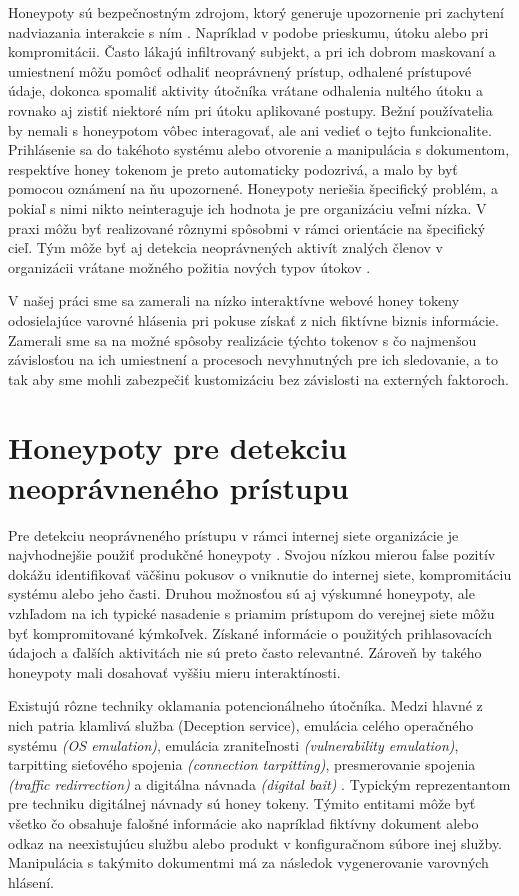 \documentclass[conference, 11pt,slovak,a4paper,twoside]{IEEEtran}
\begin{document}
Honeypoty sú bezpečnostným zdrojom, ktorý generuje upozornenie pri zachytení nadviazania interakcie s ním \cite{sanders_intrusion_2020}. Napríklad v podobe prieskumu, útoku alebo pri kompromitácii. Často lákajú infiltrovaný subjekt, a pri ich dobrom maskovaní a umiestnení môžu pomôcť odhaliť neoprávnený prístup, odhalené prístupové údaje, dokonca spomaliť aktivity útočníka vrátane odhalenia nultého útoku a rovnako aj zistiť niektoré ním pri útoku aplikované postupy. Bežní používatelia by nemali s honeypotom vôbec interagovať, ale ani vedieť o tejto funkcionalite. Prihlásenie sa do takéhoto systému alebo otvorenie a manipulácia s dokumentom, respektíve honey tokenom \cite{ng_honeypot_2018} je preto automaticky podozrivá, a malo by byť pomocou oznámení na ňu upozornené. Honeypoty neriešia špecifický problém, a pokiaľ s nimi nikto neinteraguje ich hodnota je pre organizáciu veľmi nízka. V praxi môžu byť realizované rôznymi spôsobmi v rámci orientácie na špecifický cieľ. Tým môže byť aj detekcia neoprávnených aktivít znalých členov v organizácii vrátane možného požitia nových typov útokov \cite{spitzner_honeypots_2003}.

V našej práci sme sa zamerali na nízko interaktívne webové honey tokeny odosielajúce varovné hlásenia pri pokuse získať z nich fiktívne biznis informácie. Zamerali sme sa na možné spôsoby realizácie týchto tokenov s čo najmenšou závislosťou na ich umiestnení a procesoch nevyhnutných pre ich sledovanie, a to tak aby sme mohli zabezpečiť kustomizáciu bez závislosti na externých faktoroch.


\section{Honeypoty pre detekciu neoprávneného prístupu}

Pre detekciu neoprávneného prístupu v rámci internej siete organizácie je najvhodnejšie použiť produkčné honeypoty \cite{jahankhani_analysis_2015}. Svojou nízkou mierou false pozitív dokážu identifikovať väčšinu pokusov o vniknutie do internej siete, kompromitáciu systému alebo jeho časti. Druhou možnosťou sú aj výskumné honeypoty, ale vzhľadom na ich typické nasadenie s priamim prístupom do verejnej siete môžu byť kompromitované kýmkoľvek. Získané informácie o použitých prihlasovacích údajoch a ďalších aktivitách nie sú preto často relevantné. Zároveň by takého honeypoty mali dosahovať vyššiu mieru interaktínosti.

Existujú rôzne techniky oklamania potencionálneho útočníka. Medzi hlavné z nich patria klamlivá služba (Deception service), emulácia celého operačného systému \emph{(OS emulation)}, emulácia zraniteľnosti \emph{(vulnerability emulation)}, tarpitting sieťového spojenia \emph{(connection tarpitting)}, presmerovanie spojenia \emph{(traffic redirrection)} a digitálna návnada \emph{(digital bait)} \cite{qassrawi_deception_2010}. Typickým reprezentantom pre techniku digitálnej návnady sú honey tokeny. Týmito entitami môže byť všetko čo obsahuje falošné informácie \cite{qassrawi_deception_2010} ako napríklad fiktívny dokument alebo odkaz na neexistujúcu službu alebo produkt v konfiguračnom súbore inej služby. Manipulácia s takýmito dokumentmi má za následok vygenerovanie varovných hlásení.
\end{document}
